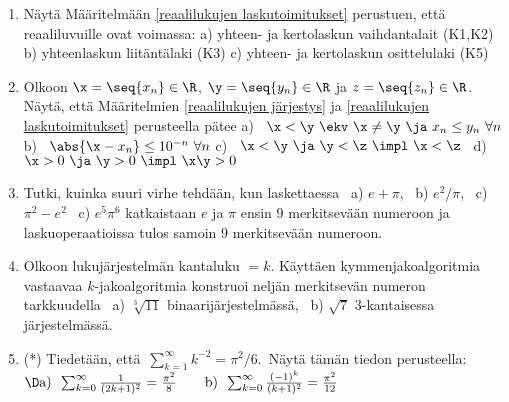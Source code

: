 \Harj
\begin{enumerate}

\item \label{H-I-9: R:n kunta-aksioomat} 
Näytä Määritelmään \ref{reaalilukujen laskutoimitukset} perustuen, että reaaliluvuille
ovat voimassa: \newline
a) yhteen- ja kertolaskun vaihdantalait (K1,K2) \newline 
b) yhteenlaskun liitäntälaki (K3) \newline
c) yhteen- ja kertolaskun osittelulaki (K5)

\item \label{H-I-9: R:n järjestysominaisuuksia}
Olkoon $\x=\seq{x_n}\in\R$, $\y=\seq{y_n}\in\R$ ja $z=\seq{z_n}\in\R$. Näytä, että Määritelmien
\ref{reaalilukujen järjestys} ja \ref{reaalilukujen laskutoimitukset} perusteella pätee \newline 
a) \ $\x<\y\ \ekv\ \x \neq \y\ \ja\ x_n \le y_n\ \forall n$ \hspace{5mm}
b) \ $\abs{\x-x_n} \le 10^{-n}\ \forall n$ \newline
c) \ $\x<\y\ \ja\ \y<\z\ \impl\ \x<\z$ \hspace{15mm}\,
d) \ $\x>0\ \ja\ \y>0\ \impl\ \x\y>0$

\item
Tutki, kuinka suuri virhe tehdään, kun laskettaessa \ a) $e+\pi$, \ b) $e^2/\pi$, \ 
c) $\pi^2-e^2$ \ c) $e^5\pi^6$ katkaistaan $e$ ja $\pi$ ensin $9$ merkitsevään numeroon
ja laskuoperaatioissa tulos samoin $9$ merkitsevään numeroon.

\item
Olkoon lukujärjestelmän kantaluku $=k$. Käyttäen kymmenjakoalgoritmia vastaavaa 
$k$-jakoalgoritmia konstruoi neljän merkitsevän numeron tarkkuudella \ a) $\sqrt[3]{11}$
binaarijärjestelmässä, \ b) $\sqrt{7}$ $3$-kantaisessa järjestelmässä.

\item (*)
Tiedetään, että $\,\sum_{k=1}^\infty k^{-2}=\pi^2/6$. \,Näytä tämän tiedon perusteella:
\vspace{1mm}\newline
$\D
\text{a)}\,\ \sum_{k=0}^\infty \frac{1}{(2k+1)^2}=\frac{\pi^2}{8} \qquad
\text{b)}\,\ \sum_{k=0}^\infty \frac{(-1)^k}{(k+1)^2}=\frac{\pi^2}{12}$



\end{enumerate}
